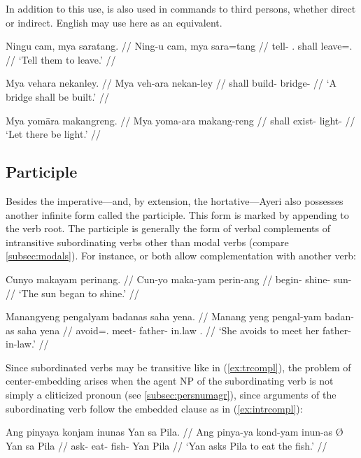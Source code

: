 In addition to this use,  is also used in commands to third 
persons, whether direct or indirect. English may use  here as an 
equivalent.

\pex
\a\begingl
	\gla Ningu cam, mya saratang. //
	\glb Ning-u cam, mya sara=tang //
	\glc tell-\Imp{} \TplM{}.\Dat{} shall leave=\TplM{}.\Aarg{} //
	\glft `Tell them to leave.' //
\endgl

\a\begingl
	\gla Mya vehara nekanley. //
	\glb Mya veh-ara nekan-ley //
	\glc shall build-\TsgI{} bridge-\PargI{} //
	\glft `A bridge shall be built.' //
\endgl

\a\begingl
	\gla Mya yomāra makangreng. //
	\glb Mya yoma-ara makang-reng //
	\glc shall exist-\TsgI{} light-\AargI{} //
	\glft `Let there be light.' //
\endgl
\xe


\subsection{Participle}
\label{subsec:participle}
Besides the imperative---and, by extension, the hortative---Ayeri also 
possesses another infinite form called the participle. This form is marked by 
appending  to the verb root. The participle is generally the 
form of verbal complements of intransitive subordinating verbs other than 
modal verbs (compare \autoref{subsec:modals}). For instance,  
 or  both allow 
complementation with another verb:

\pex
\a\label{ex:intrcompl}\begingl
	\gla Cunyo makayam perinang. // 
	\glb Cun-yo maka-yam perin-ang // 
	\glc begin-\TsgN{} shine-\Ptcp{} sun-\Aarg{} //
	\glft `The sun began to shine.' //
\endgl

\a\label{ex:trcompl}\begingl
	\gla Manangyeng pengalyam badanas saha yena. //
	\glb Manang yeng pengal-yam badan-as saha yena //
	\glc avoid=\TsgF{}.\Aarg{} meet-\Ptcp{} father-\Parg{} in.law 
		\TsgF{}.\Gen{} //
	\glft `She avoids to meet her father-in-law.' //
\endgl
\xe

Since subordinated verbs may be transitive like in (\ref{ex:trcompl}), the 
problem of center-embedding arises when the agent NP of the subordinating verb 
is not simply a cliticized pronoun (see \autoref{subsec:persnumagr}), since 
arguments of the subordinating verb follow the embedded clause as in 
(\ref{ex:intrcompl}):

\pex[*=\ques\ques]
\a\ljudge{\ques}\begingl
	\gla Ang pinyaya \normalfont{[}konjam inunas\normalfont{]} {} Yan sa 
		Pila. //
	\glb Ang pinya-ya kond-yam inun-as Ø Yan sa Pila //
	\glc \AgtT{} ask-\TsgM{} eat-\Ptcp{} fish-\Parg{} \Top{} Yan \Parg{} 		Pila //
	\glft `Yan asks Pila to eat the fish.' //
\endgl

